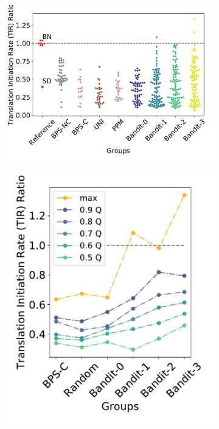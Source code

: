\documentclass{article}
\begin{document}
\begin{figure}[!ht]
    \centering
    \begin{subfigure}[b]{0.48\textwidth}
        \centering
        \caption{}
        \includegraphics[scale=0.35]{plots/Main_Paper/swarmplot.pdf}
    \end{subfigure}
    \begin{subfigure}[b]{0.25\textwidth}
        \centering
        \caption{}
        \includegraphics[scale=0.35]{plots/Main_Paper/quantplot.pdf}

\end{subfigure}
\end{figure}
\end{document}
